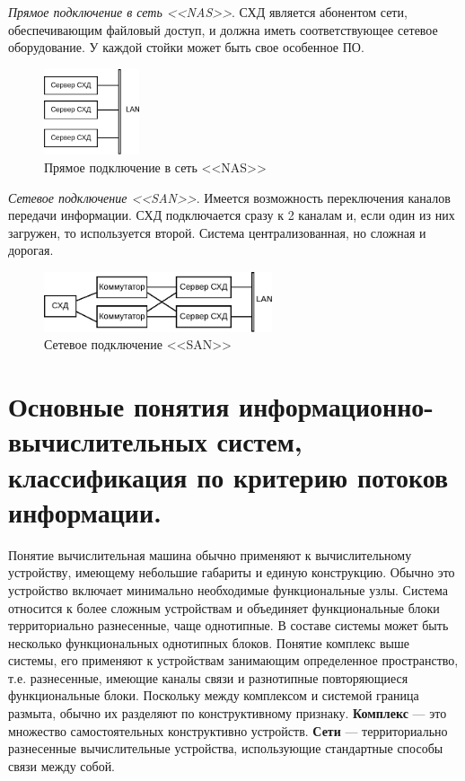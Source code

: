 \documentclass[unicode, 12pt, a4paper, oneside]{article}
\begin{document}
\textit{Прямое подключение в сеть <<NAS>>}. СХД является абонентом сети, обеспечивающим файловый доступ, и должна иметь соответствующее сетевое оборудование. У каждой стойки может быть свое особенное ПО.

\begin{figure}[H]
\centering
\includegraphics[width=0.25\textwidth]{151_nas.pdf}
\caption{Прямое подключение в сеть <<NAS>>}
\end{figure}

\textit{Сетевое подключение <<SAN>>}. Имеется возможность переключения каналов передачи информации. СХД подключается сразу к 2 каналам и, если один из них загружен, то используется второй. Система централизованная, но сложная и дорогая.

\begin{figure}[H]
\centering
\includegraphics[width=0.6\textwidth]{151_san.pdf}
\caption{Сетевое подключение <<SAN>>}
\end{figure}


\section{Основные понятия информационно-вычислительных систем, классификация по критерию потоков информации.}

Понятие вычислительная машина обычно применяют к вычислительному устройству, имеющему небольшие габариты и единую конструкцию. Обычно это устройство включает минимально необходимые функциональные узлы. Система относится к более сложным устройствам и объединяет функциональные блоки территориально разнесенные, чаще однотипные. В составе системы может быть несколько функциональных однотипных блоков. Понятие комплекс выше системы, его применяют к устройствам занимающим определенное пространство, т.е. разнесенные, имеющие каналы связи и разнотипные повторяющиеся функциональные блоки. Поскольку между комплексом и системой граница размыта, обычно их разделяют по конструктивному признаку. \textbf{Комплекс} --- это множество самостоятельных конструктивно устройств. \textbf{Сети} --- территориально разнесенные вычислительные устройства, использующие стандартные способы связи между собой.
\end{document}
